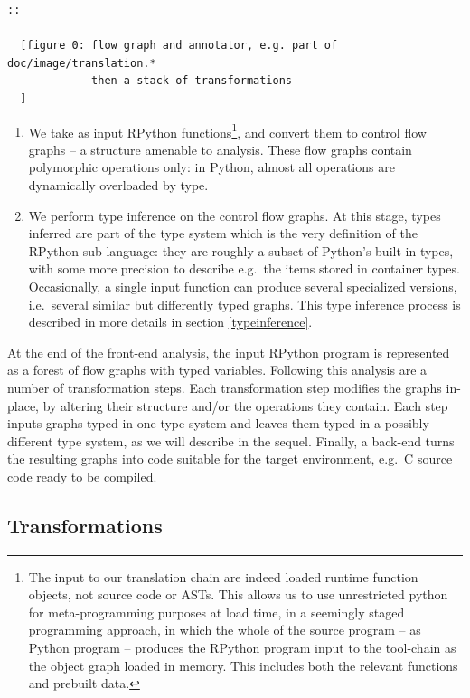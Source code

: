 \documentclass{acm_proc_article-sp}
\begin{document}
\begin{verbatim}
::

  [figure 0: flow graph and annotator, e.g. part of doc/image/translation.*
             then a stack of transformations
  ]
\end{verbatim}
%
\begin{enumerate}
\item We take as input RPython functions\footnote{The input to our
       translation chain are indeed loaded runtime function objects,
       not source code or ASTs.  This allows us to use unrestricted
       python for meta-programming purposes at load time, in a
       seemingly staged programming approach, in which the whole of
       the source program -- as Python program -- produces the RPython
       program input to the tool-chain as the object graph loaded in
       memory.  This includes both the relevant functions and prebuilt
       data.}, and convert them to control flow graphs -- a structure
       amenable to analysis.  These flow graphs contain polymorphic
       operations only: in Python, almost all operations are
       dynamically overloaded by type.

\item We perform type inference on the control flow graphs.  At this
      stage, types inferred are part of the type system which is the
      very definition of the RPython sub-language: they are roughly a
      subset of Python's built-in types, with some more precision to
      describe e.g.\ the items stored in container types.
      Occasionally, a single input function can produce several
      specialized versions, i.e.\ several similar but differently typed
      graphs.  This type inference process is described in more
      details in section \ref{typeinference}.
\end{enumerate}
At the end of the front-end analysis, the input RPython program is
represented as a forest of flow graphs with typed variables.  Following
this analysis are a number of transformation steps.  Each transformation
step modifies the graphs in-place, by altering their structure and/or
the operations they contain.  Each step inputs graphs typed in one type
system and leaves them typed in a possibly different type system, as we
will describe in the sequel.  Finally, a back-end turns the resulting
graphs into code suitable for the target environment, e.g.\ C source code
ready to be compiled.


\subsection{Transformations}
\end{document}
